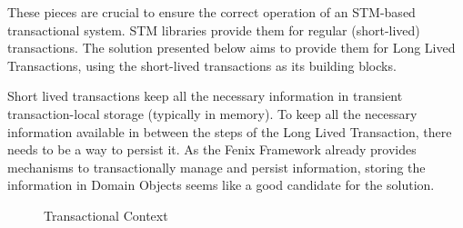 These pieces are crucial to ensure the correct operation of an
STM-based transactional system. STM libraries provide them for regular
(short-lived) transactions. The solution presented below aims to
provide them for Long Lived Transactions, using the short-lived
transactions as its building blocks.

Short lived transactions keep all the necessary information in
transient transaction-local storage (typically in memory). To keep all
the necessary information available in between the steps of the Long
Lived Transaction, there needs to be a way to persist it. As the Fenix
Framework already provides mechanisms to transactionally manage and
persist information, storing the information in Domain Objects seems
like a good candidate for the solution.

\begin{figure}
  \centering

  \caption{Transactional Context}
  \label{fig:transactionalContext}

\end{figure}

